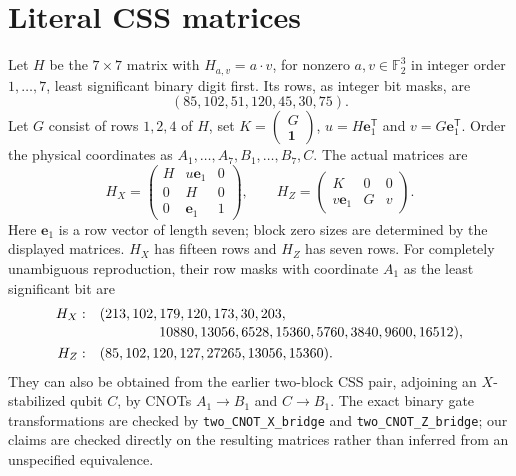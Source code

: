\documentclass[11pt]{article}
\begin{document}
\section{Literal CSS matrices}\label{sec:matrix}
Let $H$ be the $7\times7$ matrix with $H_{a,v}=a\cdot v$, for nonzero
$a,v\in\mathbb F_2^3$ in integer order $1,\ldots,7$, least significant
binary digit first. Its rows, as integer bit masks, are
\[
 (85,102,51,120,45,30,75).
\]
Let $G$ consist of rows $1,2,4$ of $H$, set
$K=\left(\begin{smallmatrix}G\\\mathbf1\end{smallmatrix}\right)$,
$u=H\mathbf e_1^{\mathsf T}$ and $v=G\mathbf e_1^{\mathsf T}$.
Order the physical coordinates as $A_1,\ldots,A_7,B_1,\ldots,B_7,C$.
The actual matrices are
\begin{equation}\label{eq:pair}
H_X=\begin{pmatrix}
 H&u\mathbf e_1&0\\
 0&H&0\\
 0&\mathbf e_1&1
\end{pmatrix},\qquad
H_Z=\begin{pmatrix}
 K&0&0\\
 v\mathbf e_1&G&v
\end{pmatrix}.
\end{equation}
Here $\mathbf e_1$ is a row vector of length seven; block zero sizes are
determined by the displayed matrices. $H_X$ has fifteen rows and $H_Z$
has seven rows. For completely unambiguous reproduction, their row masks
with coordinate $A_1$ as the least significant bit are
\begin{align*}
H_X:\quad &(213,102,179,120,173,30,203,\\[-2pt]
           &\hspace{15mm}10880,13056,6528,15360,5760,3840,9600,16512),\\
H_Z:\quad &(85,102,120,127,27265,13056,15360).
\end{align*}
They can also be obtained from the earlier two-block CSS pair, adjoining
an $X$-stabilized qubit $C$, by CNOTs $A_1\to B_1$ and $C\to B_1$.
The exact binary gate transformations are checked by
\texttt{two\_CNOT\_X\_bridge} and \texttt{two\_CNOT\_Z\_bridge}; our claims
are checked directly on the resulting matrices rather than inferred from
an unspecified equivalence.
\end{document}
